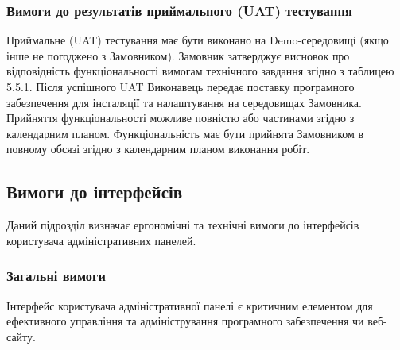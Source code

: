 \documentclass{article}
\begin{document}
\subsubsection{Вимоги до результатів приймального (UAT) тестування}

Приймальне (UAT) тестування має бути виконано на Demo-середовищі (якщо інше не погоджено з Замовником).
Замовник затверджує висновок про відповідність функціональності вимогам технічного завдання згідно з таблицею 5.5.1.
Після успішного UAT Виконавець передає поставку програмного забезпечення для інсталяції та налаштування на середовищах Замовника.
Прийняття функціональності можливе повністю або частинами згідно з календарним планом.
Функціональність має бути прийнята Замовником в повному обсязі згідно з календарним планом виконання робіт.

\newpage
\subsection{Вимоги до інтерфейсів}

Даний підрозділ визначає ергономічні та технічні вимоги до інтерфейсів користувача адміністративних панелей.

\subsubsection{Загальні вимоги}

Інтерфейс користувача адміністративної панелі є критичним елементом для ефективного управління та
адміністрування програмного забезпечення чи веб-сайту.
\end{document}
